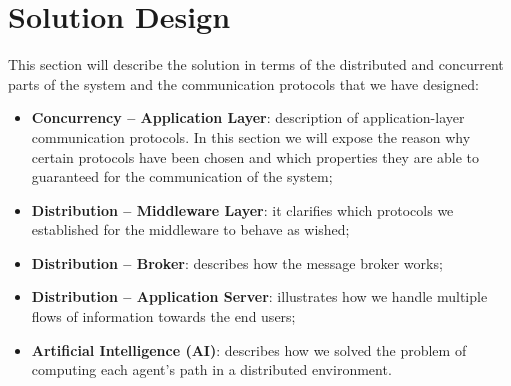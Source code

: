 \section{Solution Design}

This section will describe the solution in terms of the distributed and
concurrent parts of the system and the communication protocols that we have
designed:

\begin{itemize}
\item \textbf{Concurrency -- Application Layer}:
  description of application-layer communication protocols. In this section we
  will expose the reason why certain protocols have been chosen and which
  properties they are able to guaranteed for the communication of the system;
\item \textbf{Distribution -- Middleware Layer}:
  it clarifies which protocols
  we established for the middleware to behave as wished;
\item \textbf{Distribution -- Broker}:
  describes how the message broker works;
\item \textbf{Distribution -- Application Server}:
  illustrates how we handle multiple flows of information towards the end
  users;
\item \textbf{Artificial Intelligence (AI)}:
  describes how we solved the problem of computing each agent's path
  in a distributed environment.
\end{itemize}







